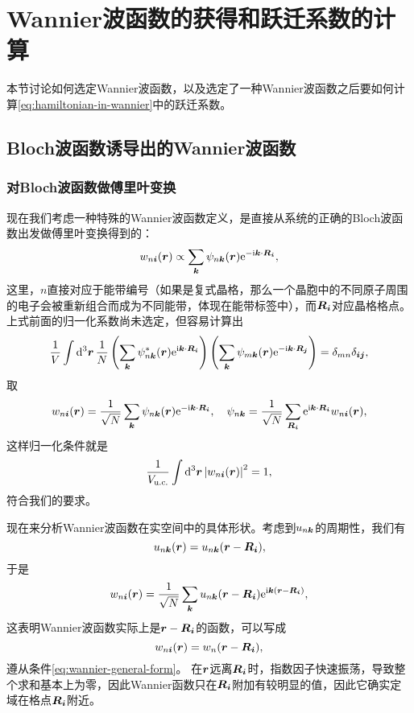 \section{Wannier波函数的获得和跃迁系数的计算}

本节讨论如何选定Wannier波函数，以及选定了一种Wannier波函数之后要如何计算\eqref{eq:hamiltonian-in-wannier}中的跃迁系数。

\subsection{Bloch波函数诱导出的Wannier波函数}

\subsubsection{对Bloch波函数做傅里叶变换}

现在我们考虑一种特殊的Wannier波函数定义，是直接从系统的正确的Bloch波函数出发做傅里叶变换得到的：
\[
    w_{n\vb*{i}}(\vb*{r}) \propto \sum_{\vb*{k}} \psi_{n\vb*{k}}(\vb*{r}) \mathrm{e}^{- \mathrm{i} \vb*{k} \cdot \vb*{R}_{\vb*{i}}},
\]
这里，$n$直接对应于能带编号（如果是复式晶格，那么一个晶胞中的不同原子周围的电子会被重新组合而成为不同能带，体现在能带标签中），而$\vb*{R}_{\vb*{i}}$对应晶格格点。
上式前面的归一化系数尚未选定，但容易计算出
\[
    \frac{1}{V} \int \dd[3]{\vb*{r}} \frac{1}{N} \left( \sum_{\vb*{k}} \psi^*_{n\vb*{k}}(\vb*{r}) \mathrm{e}^{\mathrm{i} \vb*{k} \cdot \vb*{R}_{\vb*{i}}} \right) \left( \sum_{\vb*{k}} \psi_{m\vb*{k}}(\vb*{r}) \mathrm{e}^{- \mathrm{i} \vb*{k} \cdot \vb*{R}_{\vb*{j}}} \right) = \delta_{mn} \delta_{\vb*{i} \vb*{j}},
\]
取
\begin{equation}
    w_{n\vb*{i}}(\vb*{r}) = \frac{1}{\sqrt{N}} \sum_{\vb*{k}} \psi_{n\vb*{k}}(\vb*{r}) \mathrm{e}^{-\mathrm{i} \vb*{k} \cdot \vb*{R}_{\vb*{i}}}, \quad \psi_{n\vb*{k}} = \frac{1}{\sqrt{N}} \sum_{\vb*{R}_{\vb*{i}}} \mathrm{e}^{\mathrm{i} \vb*{k} \cdot \vb*{R}_{\vb*{i}}} w_{n \vb*{i}}(\vb*{r}),
    \label{eq:wannier-from-bloch}
\end{equation}
这样归一化条件就是
\begin{equation}
    \frac{1}{V_\text{u.c.}} \int \dd[3]{\vb*{r}} \abs{w_{n \vb*{i}}(\vb*{r})}^2 = 1,
\end{equation}
符合我们的要求。

现在来分析Wannier波函数在实空间中的具体形状。考虑到$u_{n\vb*{k}}$的周期性，我们有
\[
    u_{n\vb*{k}} (\vb*{r}) = u_{n\vb*{k}} (\vb*{r} - \vb*{R}_{\vb*{i}}),
\]
于是
\begin{equation}
    w_{n \vb*{i}}(\vb*{r}) = \frac{1}{\sqrt{N}} \sum_{\vb*{k}} u_{n\vb*{k}} (\vb*{r} - \vb*{R}_{\vb*{i}}) \mathrm{e}^{\mathrm{i} \vb*{k} (\vb*{r} - \vb*{R}_{\vb*{i}})},
\end{equation}
这表明Wannier波函数实际上是$\vb*{r} - \vb*{R}_{\vb*{i}}$的函数，可以写成
\begin{equation}
    w_{n\vb*{i}}(\vb*{r}) = w_{n}(\vb*{r} - \vb*{R}_{\vb*{i}}),
\end{equation}
遵从条件\eqref{eq:wannier-general-form}。
在$\vb*{r}$远离$\vb*{R}_{\vb*{i}}$时，指数因子快速振荡，导致整个求和基本上为零，因此Wannier函数只在$\vb*{R}_{\vb*{i}}$附加有较明显的值，因此它确实定域在格点$\vb*{R}_{\vb*{i}}$附近。


